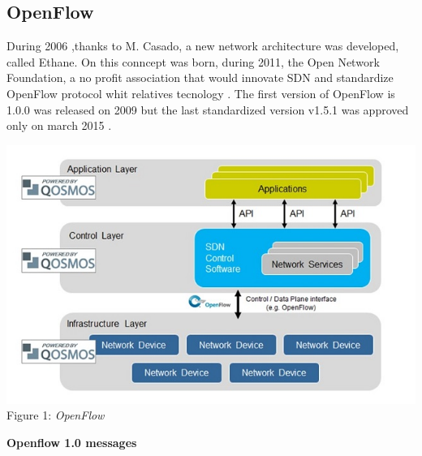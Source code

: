 \documentclass[article,10pt]{IEEEtran}
\begin{document}
\subsection{OpenFlow}
  During 2006 ,thanks to M. Casado, a new network architecture was developed, called Ethane.
  On this conncept was born, during 2011, the Open Network Foundation, a no profit association that would innovate SDN and standardize OpenFlow protocol whit relatives tecnology \cite{ONF}.
  The first version of OpenFlow is 1.0.0 was released on 2009 but the last standardized version v1.5.1 was approved only on march 2015 \cite{ONF_report}.
\begin{center}
 \centering
 \includegraphics[scale=0.58]{images/of.jpg}
 {Figure 1: \emph{OpenFlow}}
\end{center}
\textbf{Openflow 1.0 messages}
  
\end{document}
